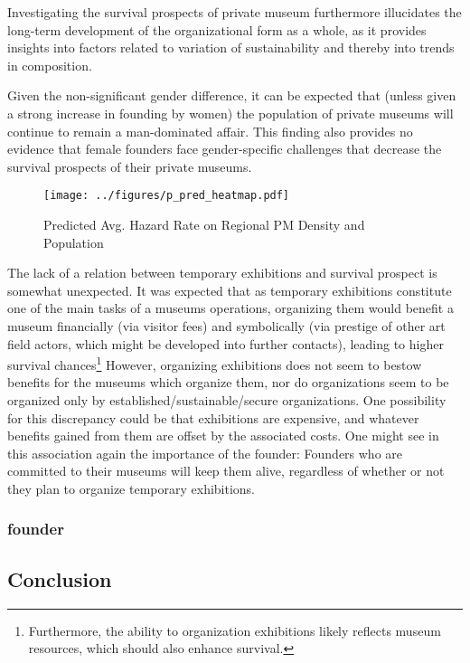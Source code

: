 \documentclass[12pt]{article}
\begin{document}
Investigating the survival prospects of private museum furthermore illucidates the long-term development of the organizational form as a whole, as it provides insights into factors related to variation of sustainability and thereby into trends in composition. 


Given the non-significant gender difference, it can be expected that (unless given a strong increase in founding by women) the population of private museums will continue to remain a man-dominated affair.
This finding also provides no evidence that female founders face gender-specific challenges that decrease the survival prospects of their private museums. 





\begin{figure}[htbp]
\centering
\texttt{[image: ../figures/p\_pred\_heatmap.pdf]}
\caption{\label{fig:p_pred_heatmap}Predicted Avg. Hazard Rate on Regional PM Density and Population}
\end{figure}


The lack of a relation between temporary exhibitions and survival prospect is somewhat unexpected.
It was expected that as temporary exhibitions constitute one of the main tasks of a museums operations, organizing them would benefit a museum financially (via visitor fees) and symbolically (via prestige of other art field actors, which might be developed into further contacts), leading to higher survival chances\footnote{Furthermore, the ability to organization exhibitions likely reflects museum resources, which should also enhance survival.}
However, organizing exhibitions does not seem to bestow benefits for the museums which organize them, nor do organizations seem to be organized only by established/sustainable/secure organizations.
One possibility for this discrepancy could be that exhibitions are expensive, and whatever benefits gained from them are offset by the associated costs.
One might see in this association again the importance of the founder:
Founders who are committed to their museums will keep them alive, regardless of whether or not they plan to organize temporary exhibitions.
\subsubsection*{founder}

\subsection*{Conclusion}
\end{document}
